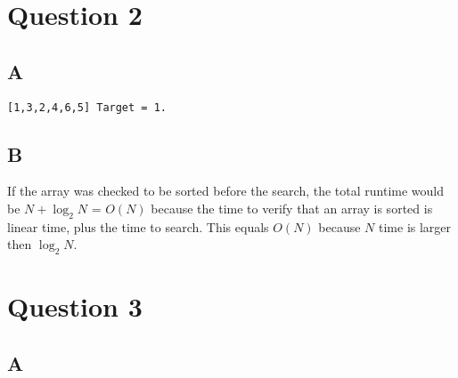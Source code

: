 \documentclass[12pt]{article} %
\begin{document}
\section{Question 2}
\subsection{A}
\begin{lstlisting}
[1,3,2,4,6,5] Target = 1.
\end{lstlisting}
\subsection{B}
If the array was checked to be sorted before the search, the total runtime would be $N + \log_{2}N$ = $O(N)$ because the time to verify that an array is sorted is linear time, plus the time to search. This equals $O(N)$ because $N$ time is larger then $\log_{2}N$.
\section{Question 3}
\subsection{A}
\noindent{}
\end{document}
